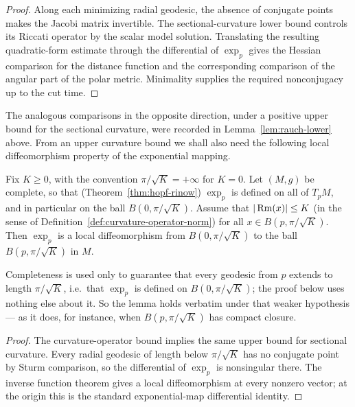 \begin{proof}
\sketch
{}
Along each minimizing radial geodesic, the absence of conjugate points makes the Jacobi matrix invertible. The sectional-curvature lower bound controls its Riccati operator by the scalar model solution. Translating the resulting quadratic-form estimate through the differential of $\exp_p$ gives the Hessian comparison for the distance function and the corresponding comparison of the angular part of the polar metric. Minimality supplies the required nonconjugacy up to the cut time.
\end{proof}

The analogous comparisons in the opposite direction, under a
positive upper bound for the sectional curvature, were recorded in
Lemma~\ref{lem:rauch-lower} above. From an upper curvature bound we
shall also need the following local diffeomorphism property of the
exponential mapping.



\begin{lemma}
\label{lem:local-diffeomorphism-bounded-curvature}


\label{localdiffeo}



Fix $K\ge 0$, with the convention $\pi/\sqrt K=+\infty$ for $K=0$.
Let $(M,g)$ be complete, so that (Theorem~\ref{thm:hopf-rinow})
$\exp_p$ is defined on all of $T_pM$, and in particular on the ball
$B(0,\pi/\sqrt{K})$. Assume that $|\operatorname{Rm}(x)|\le K$ (in the sense of
Definition~\ref{def:curvature-operator-norm}) for all $x\in
B(p,\pi/\sqrt{K})$. Then
$\exp_p$ is a local diffeomorphism from $B(0,\pi/\sqrt{K})$ to
the  ball $B(p,\pi/\sqrt{K})$ in
$M$.
\end{lemma}

Completeness is used only to guarantee that every geodesic from $p$
extends to length $\pi/\sqrt K$, i.e.\ that $\exp_p$ is defined on
$B(0,\pi/\sqrt K)$; the proof below uses nothing else about it. So
the lemma holds verbatim under that weaker hypothesis --- as it does,
for instance, when $B(p,\pi/\sqrt K)$ has compact closure.

\begin{proof}
\sketch
{}
The curvature-operator bound implies the same upper bound for sectional curvature. Every radial geodesic of length below $\pi/\sqrt K$ has no conjugate point by Sturm comparison, so the differential of $\exp_p$ is nonsingular there. The inverse function theorem gives a local diffeomorphism at every nonzero vector; at the origin this is the standard exponential-map differential identity.
\end{proof}


